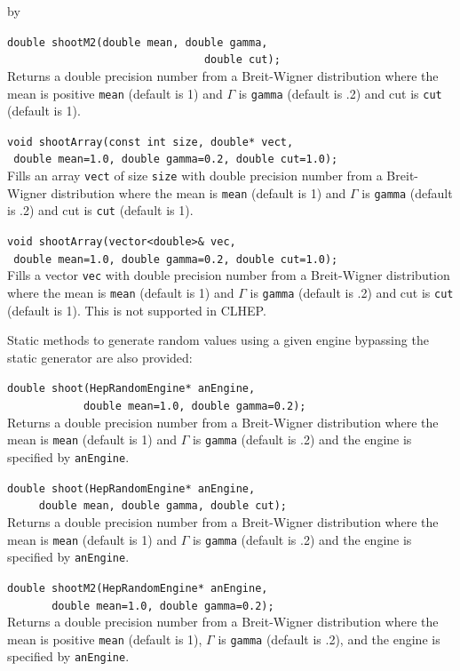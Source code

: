 \documentclass[twoside]{article}
\newcommand{\comp}[1]{\texttt{#1}}%
\newcommand{\entrylabel}[1]{\mbox{\textbf{{#1}}}\hfil}%
\newenvironment{entry}
{\begin{list}{}%
    {\renewcommand{\makelabel}{\entrylabel}%
     \setlength{\labelwidth}{90pt}%
     \setlength{\leftmargin}{\labelwidth}
     \advance\leftmargin by \labelsep%
      }%
    }%
  {\end{list}}
\newcommand{\Entrylabel}[1]%
{\raisebox{0pt}[1ex][0pt]{\makebox[\labelwidth][l]%
    {\parbox[t]{\labelwidth}{\hspace{0pt}\textbf{{#1}}}}}}
\newenvironment{Entry}%
{\renewcommand{\entrylabel}{\Entrylabel}\begin{entry}}%
  {\end{entry}}
\begin{document}
\begin{description}
\begin{Entry}
    \verb+double shootM2(double mean, double gamma,+\\
    \verb+                               double cut);+\\
    Returns a double precision number from a Breit-Wigner
    distribution where the mean is positive \comp{mean} (default is 1)
    and $\Gamma$ is \comp{gamma} (default is .2) and cut is
    \comp{cut} (default is 1).
    
    \verb+void shootArray(const int size, double* vect,+\\
    \verb+ double mean=1.0, double gamma=0.2, double cut=1.0);+\\
    Fills an array \comp{vect} of size \comp{size} with double
    precision number from a Breit-Wigner
    distribution where the mean is \comp{mean} (default is 1)
    and $\Gamma$ is \comp{gamma} (default is .2) and cut is
    \comp{cut} (default is 1).

    \verb+void shootArray(vector<double>& vec,+\\
    \verb+ double mean=1.0, double gamma=0.2, double cut=1.0);+\\
    Fills a vector \comp{vec} with double
    precision number from a Breit-Wigner
    distribution where the mean is \comp{mean} (default is 1)
    and $\Gamma$ is \comp{gamma} (default is .2) and cut is
    \comp{cut} (default is 1).  This is not supported in CLHEP.
    
    Static methods to generate random values using a given engine
    bypassing the static generator are also provided:

    \verb+double shoot(HepRandomEngine* anEngine,+\\
    \verb+            double mean=1.0, double gamma=0.2);+\\
    Returns a double precision number from a Breit-Wigner
    distribution where the mean is \comp{mean} (default is 1)
    and $\Gamma$ is \comp{gamma} (default is .2) and the engine
    is specified by \comp{anEngine}.
    
    \verb+double shoot(HepRandomEngine* anEngine,+\\
    \verb+     double mean, double gamma, double cut);+\\
    Returns a double precision number from a Breit-Wigner
    distribution where the mean is \comp{mean} (default is 1)
    and $\Gamma$ is \comp{gamma} (default is .2) and the engine
    is specified by \comp{anEngine}.
    
    \verb+double shootM2(HepRandomEngine* anEngine,+\\
    \verb+       double mean=1.0, double gamma=0.2);+\\
    Returns a double precision number from a Breit-Wigner
    distribution where the mean is positive \comp{mean} (default is 1),
    $\Gamma$ is \comp{gamma} (default is .2), and the engine
    is specified by \comp{anEngine}.
    

\end{Entry}
\end{description}
\end{document}
